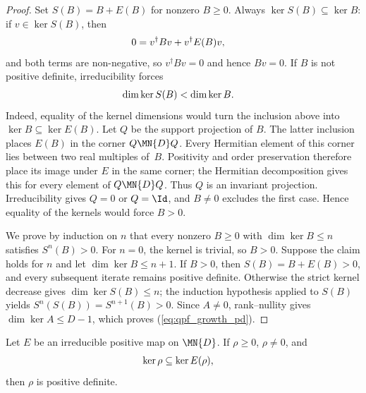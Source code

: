 \begin{proof}\leanok
    Set $S(B)=B+E(B)$ for nonzero $B\geq0$. Always
    $\ker S(B)\subseteq\ker B$: if $v\in\ker S(B)$, then
    \begin{align}
        0
         & =v^\dagger Bv+v^\dagger E(B)v,
        \notag
    \end{align}
    and both terms are non-negative, so $v^\dagger Bv=0$ and hence $Bv=0$.
    If $B$ is not positive definite, irreducibility forces
    \begin{align}
        \dim\ker S(B)
         & <\dim\ker B.
        \notag
    \end{align}
    Indeed, equality of the kernel dimensions would turn the inclusion above
    into $\ker B\subseteq\ker E(B)$. Let $Q$ be the support projection of
    $B$. The latter inclusion places $E(B)$ in the corner $Q\MN{D}Q$.
    Every Hermitian element of this corner lies between two real multiples
    of~$B$. Positivity and order preservation therefore place its image under
    $E$ in the same corner; the Hermitian decomposition gives this for every
    element of $Q\MN{D}Q$. Thus $Q$ is an invariant projection.
    Irreducibility gives $Q=0$ or $Q=\Id$, and $B\neq0$ excludes the first
    case. Hence equality of the kernels would force $B>0$.

    We prove by induction on $n$ that every nonzero $B\geq0$ with
    $\dim\ker B\leq n$ satisfies $S^n(B)>0$. For $n=0$, the kernel is
    trivial, so $B>0$. Suppose the claim holds for $n$ and let
    $\dim\ker B\leq n+1$. If $B>0$, then $S(B)=B+E(B)>0$, and every
    subsequent iterate remains positive definite. Otherwise the strict
    kernel decrease gives $\dim\ker S(B)\leq n$; the induction hypothesis
    applied to $S(B)$ yields
    $S^n(S(B))=S^{n+1}(B)>0$. Since $A\neq0$, rank--nullity gives
    $\dim\ker A\leq D-1$, which proves (\ref{eq:qpf_growth_pd}).
\end{proof}

\begin{theorem}
    \label{thm:kernel_inclusion_pd_irred}
    \leanok
    Let $E$ be an irreducible positive map on $\MN{D}$.
    If $\rho\geq0$, $\rho\neq0$, and
    \begin{align}
        \ker\rho
         & \subseteq\ker E(\rho),
        \notag
    \end{align}
    then $\rho$ is positive definite.
\end{theorem}

